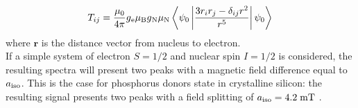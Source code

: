 \documentclass[a4paper]{book}
\newcommand{\tsub}{\textsubscript}
\newcommand{\mb}{\mathbf}
\begin{document}
	\begin{equation}
		\label{eq:2_Tij}
		T_{ij} =
		\frac{\mu_0}{4\pi}g\tsub e \mu\tsub B g\tsub N\mu\tsub N
		\left <\psi_0\left |\frac{3r_ir_j - \delta_{ij}r^2}{r^5}\right |\psi_0 \right >
	\end{equation}
	where $\mb{r}$ is the distance vector from nucleus to electron.\\
	If a simple system of electron $S = 1/2$ and nuclear spin $I = 1/2$ is considered, the resulting spectra will present two peaks with a magnetic field difference equal to $a\tsub{iso}$. This is the case for phosphorus donors state in crystalline silicon: the resulting signal presents two peaks with a field splitting of $a\tsub{iso} = 4.2 \; \text{mT}$ \cite{feherElectronSpinResonance1959}.\\
	
\end{document}
